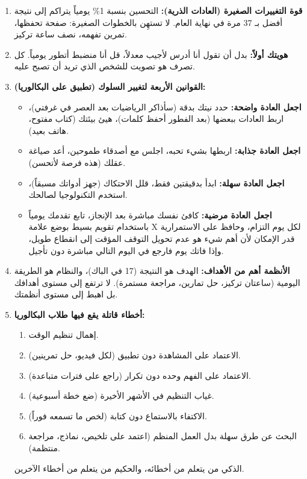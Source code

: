 \documentclass[12pt,a4paper]{book}
\begin{document}
\begin{enumerate}
		\item \textbf{قوة التغييرات الصغيرة (العادات الذرية):} التحسين بنسبة 1\% يومياً يتراكم إلى نتيجة أفضل بـ 37 مرة في نهاية العام. لا تستهِن بالخطوات الصغيرة: صفحة تحفظها، تمرين تفهمه، نصف ساعة تركيز.
		
		\item \textbf{هويتك أولاً:} بدل أن تقول أنا أدرس لأجيب معدلاً، قل أنا منضبط أتطور يومياً. كل تصرف هو تصويت للشخص الذي تريد أن تصبح عليه.
		
		\item \textbf{القوانين الأربعة لتغيير السلوك (تطبيق على البكالوريا):}
		\begin{itemize}
			\item \textbf{اجعل العادة واضحة:} حدد نيتك بدقة (سأذاكر الرياضيات بعد العصر في غرفتي)، اربط العادات ببعضها (بعد الفطور أحفظ كلمات)، هيئ بيئتك (كتاب مفتوح، هاتف بعيد).
			\item \textbf{اجعل العادة جذابة:} اربطها بشيء تحبه، اجلس مع أصدقاء طموحين، أعد صياغة عقلك (هذه فرصة لأتحسن).
			\item \textbf{اجعل العادة سهلة:} ابدأ بدقيقتين فقط، قلل الاحتكاك (جهز أدواتك مسبقاً)، استخدم التكنولوجيا لصالحك.
			\item \textbf{اجعل العادة مرضية:} كافئ نفسك مباشرة بعد الإنجاز، تابع تقدمك يومياً باستخدام تقويم بسيط بوضع علامة X لكل يوم التزام، وحافظ على الاستمرارية قدر الإمكان لأن أهم شيء هو عدم تحويل التوقف المؤقت إلى انقطاع طويل، وإذا فاتك يوم فارجع في اليوم التالي مباشرة دون تأجيل.
		\end{itemize}
		
		\item \textbf{الأنظمة أهم من الأهداف:} الهدف هو النتيجة (17 في الباك)، والنظام هو الطريقة اليومية (ساعتان تركيز، حل تمارين، مراجعة مستمرة). لا ترتفع إلى مستوى أهدافك بل اهبط إلى مستوى أنظمتك.
		
		\item \textbf{أخطاء قاتلة يقع فيها طلاب البكالوريا:}
		\begin{enumerate}
			\item إهمال تنظيم الوقت.
			\item الاعتماد على المشاهدة دون تطبيق (لكل فيديو، حل تمرينين).
			\item الاعتماد على الفهم وحده دون تكرار (راجع على فترات متباعدة).
			\item غياب التنظيم في الأشهر الأخيرة (ضع خطة أسبوعية).
			\item الاكتفاء بالاستماع دون كتابة (لخص ما تسمعه فوراً).
			\item البحث عن طرق سهلة بدل العمل المنظم (اعتمد على تلخيص، نماذج، مراجعة منتظمة).
		\end{enumerate}
		الذكي من يتعلم من أخطائه، والحكيم من يتعلم من أخطاء الآخرين.
		

\end{enumerate}
\end{document}
